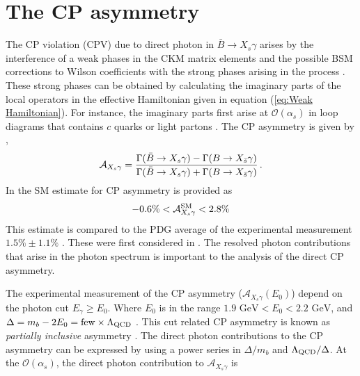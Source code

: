 \section{The CP asymmetry}
The CP violation (CPV) due to direct photon in $\bar{B}\rightarrow X_s\gamma$ arises by the interference of a weak phases in the CKM matrix elements and the possible BSM corrections to Wilson coefficients with the strong phases arising in the process \cite{Kagan:1998bh}. These strong phases can be obtained by calculating the imaginary parts of the local operators in the effective Hamiltonian given in equation (\ref{eq:Weak Hamiltonian}). For instance, the imaginary parts first arise at $\mathcal{O}(\alpha_s)$ in loop diagrams that contains $c$ quarks or light partons \cite{Kagan:1998bh}.
The CP asymmetry is given by \cite{Benzke:2010tq},
\begin{equation}\label{data}
   {\cal A}_{X_s\gamma} 
   = \frac{\Gamma(\bar B\to X_s\gamma)-\Gamma(B\to X_{\bar s}\gamma)}%
          {\Gamma(\bar B\to X_s\gamma)+\Gamma(B\to X_{\bar s}\gamma)} \,.
\end{equation}
In \cite{Benzke:2010tq} the SM estimate for CP asymmetry is provided as    
\begin{eqnarray}
-0.6\%< \mathcal{A}_{X_s\gamma}^{\rm{SM}}<2.8\%
\end{eqnarray}
This estimate is compared to the PDG average  of the experimental measurement $1.5 \% \pm 1.1 \%$ \cite{Tanabashi:2018oca}. These were first considered in \cite{Benzke:2010tq}.
The resolved photon contributions that arise in the photon spectrum is important to the analysis of the direct CP asymmetry.
\par
The experimental measurement of the CP asymmetry ($\mathcal{A}_{X_{s} \gamma}\left(E_{0}\right)$) depend on the photon cut $E_{\gamma}\geq E_0$. Where $E_0$ is in the range $1.9\text{ GeV}<E_0<2.2\text{ GeV}$, and $\Delta= m_b-2E_0= \rm{few}\times\Lambda_{\rm{QCD}}$ \cite{Benzke:2010tq}. This cut related CP asymmetry is known as \textit{partially inclusive} asymmetry \cite{Benzke:2010tq}. The direct photon contributions to the CP asymmetry can be expressed by using a power series in $\Delta/m_b$ and $\Lambda_{\rm{QCD}}/\Delta$. At the $\mathcal{O}(\alpha_s)$, the direct photon contribution to $\mathcal{A}_{X_{s} \gamma}$ is

